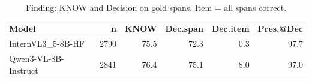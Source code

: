 \begin{table}[t]\centering\small
\caption{Finding: KNOW and Decision on gold spans. Item = all spans correct.}
\label{tab:news-decision}
\begin{tabular}{l r r r r r}\toprule
Model & n & KNOW & Dec.span & Dec.item & Pres.@Dec \\
\midrule
InternVL3_5-8B-HF & 2790 & 75.5 & 72.3 & 0.3 & 97.7 \\
Qwen3-VL-8B-Instruct & 2841 & 76.4 & 75.1 & 8.0 & 97.0 \\
\bottomrule\end{tabular}\end{table}
